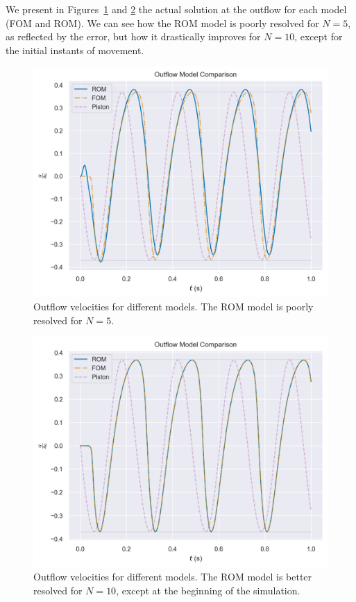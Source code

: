 \documentclass[../../thesis.tex]{subfiles}
\begin{document}
We present in Figures~\ref{fig:outflow_model_comparison_N_5} 
and \ref{fig:outflow_model_comparison_N_10} 
the actual solution at the outflow for each model (FOM and ROM).
We can see how the ROM model is poorly resolved for $N=5$, as reflected by the error,
but how it drastically improves for $N=10$, except for the initial instants of movement.
\begin{figure}[h]
    \centering
    \includegraphics[width=\columnwidth]{research_project/piston/figures/rb_certification/outflow_probes_comparison_rom_5_srom_15_online_4.png}
    \caption{Outflow velocities for different models. The ROM model is poorly resolved for $N=5$.}
    \label{fig:outflow_model_comparison_N_5}
\end{figure}
\begin{figure}[h]
    \centering
    \includegraphics[width=\columnwidth]{research_project/piston/figures/rb_certification/outflow_probes_comparison_rom_10_srom_20_online_4.png}
    \caption{Outflow velocities for different models. 
    The ROM model is better resolved for $N=10$, except at the beginning of the simulation.}
    \label{fig:outflow_model_comparison_N_10}
\end{figure}
\end{document}
